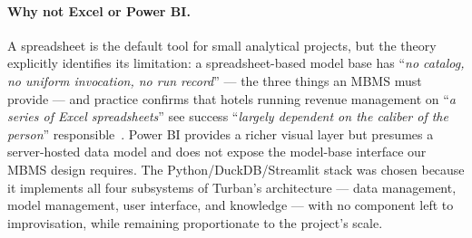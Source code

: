 \paragraph{Why not Excel or Power BI.}
A spreadsheet is the default tool for small analytical projects, but the theory explicitly identifies its limitation: a spreadsheet-based model base has ``\emph{no catalog, no uniform invocation, no run record}'' --- the three things an MBMS must provide --- and practice confirms that hotels running revenue management on ``\emph{a series of Excel spreadsheets}'' see success ``\emph{largely dependent on the caliber of the person}'' responsible~\cite{anderson2012}. Power BI provides a richer visual layer but presumes a server-hosted data model and does not expose the model-base interface our MBMS design requires. The Python/DuckDB/Streamlit stack was chosen because it implements all four subsystems of Turban's architecture --- data management, model management, user interface, and knowledge --- with no component left to improvisation, while remaining proportionate to the project's scale.
